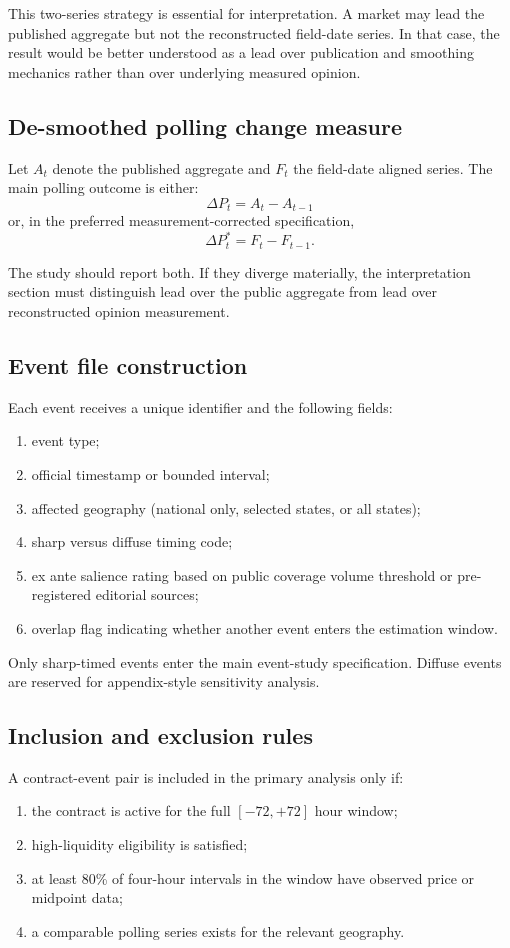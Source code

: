 \documentclass[11pt]{article}
\begin{document}
This two-series strategy is essential for interpretation. A market may lead the published aggregate but not the reconstructed field-date series. In that case, the result would be better understood as a lead over publication and smoothing mechanics rather than over underlying measured opinion.

\subsection{De-smoothed polling change measure}
Let $A_t$ denote the published aggregate and $F_t$ the field-date aligned series. The main polling outcome is either:
\[
\Delta P_t = A_t - A_{t-1}
\]
or, in the preferred measurement-corrected specification,
\[
\Delta P_t^{\ast} = F_t - F_{t-1}.
\]

The study should report both. If they diverge materially, the interpretation section must distinguish lead over the public aggregate from lead over reconstructed opinion measurement.

\subsection{Event file construction}
Each event receives a unique identifier and the following fields:
\begin{enumerate}
\item event type;
\item official timestamp or bounded interval;
\item affected geography (national only, selected states, or all states);
\item sharp versus diffuse timing code;
\item ex ante salience rating based on public coverage volume threshold or pre-registered editorial sources;
\item overlap flag indicating whether another event enters the estimation window.
\end{enumerate}

Only sharp-timed events enter the main event-study specification. Diffuse events are reserved for appendix-style sensitivity analysis.

\subsection{Inclusion and exclusion rules}
A contract-event pair is included in the primary analysis only if:
\begin{enumerate}
\item the contract is active for the full $[-72,+72]$ hour window;
\item high-liquidity eligibility is satisfied;
\item at least 80\% of four-hour intervals in the window have observed price or midpoint data;
\item a comparable polling series exists for the relevant geography.
\end{enumerate}
\end{document}
